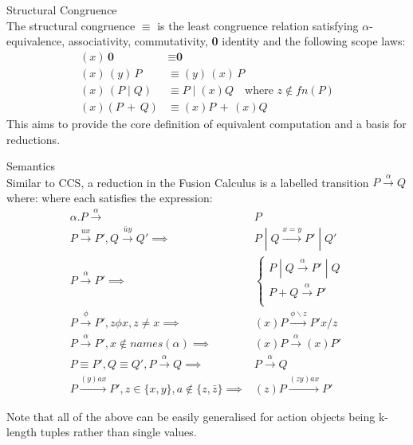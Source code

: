     \begin{definition}{Structural Congruence\\}
        \label{fusion-calculus-structural-congruence}
        The structural congruence $\equiv$ is the least congruence relation satisfying $\alpha$-equivalence, associativity, commutativity, \textbf{0} identity and the following scope laws:
        \begin{align*}
            (x) \, \textbf{0}       & \equiv \textbf{0} \\
            (x) \, (y) \, P         & \equiv (y) \, (x) \, P \\
            (x) \, (P \; | \; Q)    & \equiv P \; | \; (x)Q \quad \text{where $z \notin fn(P)$} \\
            (x)(P \, + \, Q)        & \equiv (x)P \, + \, (x)Q
        \end{align*}
        This aims to provide the core definition of equivalent computation and a basis for reductions.
    \end{definition}


    \begin{definition}{Semantics\\}
        Similar to CCS, a reduction in the Fusion Calculus is a labelled transition $P \xrightarrow{\alpha} Q$ where:
        where each satisfies the expression:
        \begin{align*}
            \alpha . P \xrightarrow{\alpha}                             & P \\
            P \xrightarrow{ux} P', Q \xrightarrow{\bar{u}y} Q' \implies & P \; | \; Q \xrightarrow{x = y} P' \; | \; Q' \\
            P \xrightarrow{\alpha} P' \implies                          &
            \begin{cases}
                P \; | \; Q \xrightarrow{\alpha} P' \; | \; Q \\
                P + Q \xrightarrow{\alpha} P' \\
            \end{cases} \\
            P \xrightarrow{\phi} P', z \phi x, z \neq x \implies                            & (x)P \xrightarrow{\phi \backslash z} P'{x / z} \\
            P \xrightarrow{\alpha} P', x \notin names(\alpha) \implies                      & (x)P \xrightarrow{\alpha} (x)P' \\
            P \equiv P', Q \equiv Q', P \xrightarrow{\alpha} Q \implies                     & P \xrightarrow{\alpha} Q \\
            P \xrightarrow{(y) a x} P', z \in \{x, y\}, a \notin \{z, \bar{z}\} \implies    & (z)P \xrightarrow{(z y) a x} P'
        \end{align*}
    \end{definition}
    Note that all of the above can be easily generalised for action objects being k-length tuples rather than single values.


